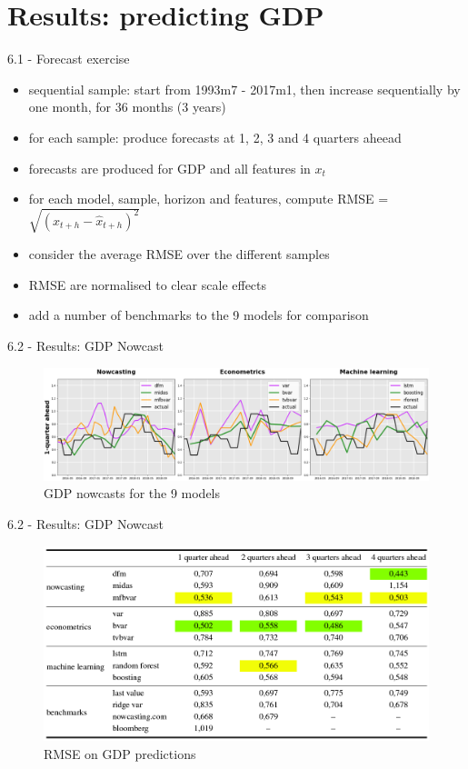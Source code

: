 \section{Results: predicting GDP}

\begin{frame}{6.1 - Forecast exercise}
	\begin{itemize}
		\item sequential sample: start from 1993m7 - 2017m1, then increase sequentially by one month, for 36 months (3 years)
		\item for each sample: produce forecasts at 1, 2, 3 and 4 quarters aheead
		\item forecasts are produced for GDP and all features in $x_t$
		\item for each model, sample, horizon and features, compute RMSE = $\sqrt{(x_{t+h} - \hat{x}_{t+h})^2}$
		\item consider the average RMSE over the different samples
		\item RMSE are normalised to clear scale effects
		\item add a number of benchmarks to the 9 models for comparison
	\end{itemize}	
\end{frame}

\begin{frame}{6.2 - Results: GDP Nowcast}
	\begin{figure}[h]
		\centering
		\includegraphics[width=1\linewidth]{im1}
		\caption{GDP nowcasts for the 9 models}
		\label{fig_62_1}
	\end{figure}
\end{frame}

\begin{frame}{6.2 - Results: GDP Nowcast}
\begin{figure}[h]
	\centering
	\includegraphics[width=.9\linewidth]{im2}
	\caption{RMSE on GDP predictions}
	\label{fig_62_2}
\end{figure}
\end{frame}

